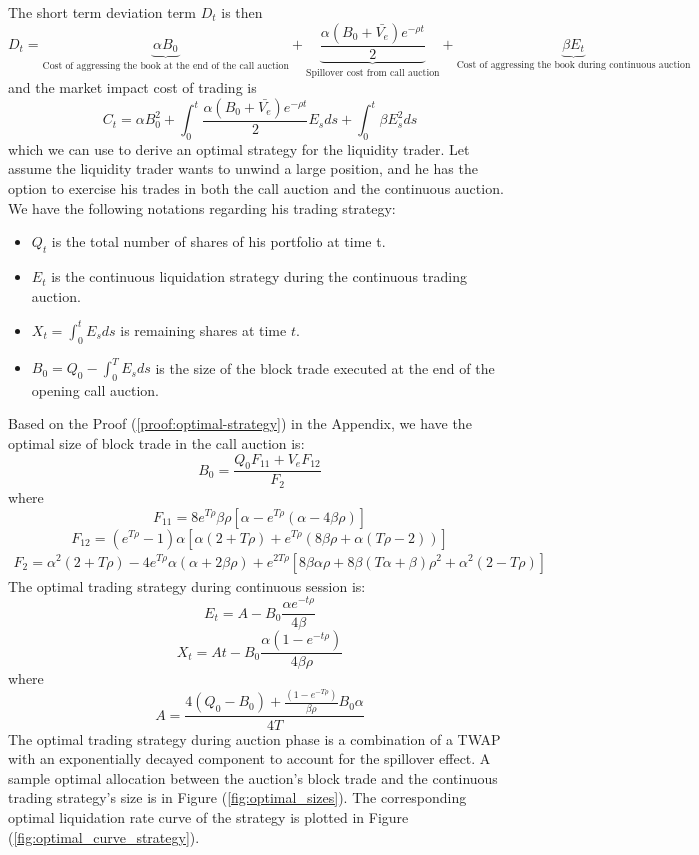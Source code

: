 \documentclass{article}
\begin{document}
The short term deviation term $D_t$ is then
\[
  D_t = \underbrace{\alpha B_0 }_\text{Cost of aggressing the book at the end of the call auction} +
  \underbrace{\frac{\alpha (B_0 + \bar{V_e}) e^{-\rho t}}{2}}_\text{Spillover cost from call auction} +  \underbrace{\beta E_t}_\text{Cost of aggressing the book during continuous auction}
\]
and the market impact cost of trading is
\begin{equation}\label{eqn:cost_equation_all}
  C_t = \alpha B_0^2 + \int_0^t \frac{\alpha (B_0 + \bar{V_e}) e^{-\rho t}}{2} E_s ds + \int_0^t \beta E_s^2 ds
\end{equation}
which we can use to derive an optimal strategy for the liquidity trader. Let assume the liquidity trader wants to unwind a large position, and he has the option to exercise his trades in both the call auction and the continuous auction. We have the following notations regarding his trading strategy:

\begin{itemize}
  \item $Q_t$ is the total number of shares of his portfolio at time t.
  \item $E_t$ is the continuous liquidation strategy during the continuous trading auction.
  \item $X_t=\int_0^t E_s ds$ is remaining shares at time $t$.
  \item $B_0=Q_0 - \int_0^T E_s ds$ is the size of the block trade executed at the end of the opening call auction.
\end{itemize}

Based on the Proof (\ref{proof:optimal-strategy}) in the Appendix, we have the optimal size of block trade in the call auction is:
\[
  B_0 = \frac{Q_0 F_{11} + V_e F_{12}}{F_2}
\]
where
\[
  F_{11} = 8 e^{T \rho} \beta \rho [\alpha - e^{T \rho} (\alpha - 4 \beta \rho)]
\]
\[
  F_{12} = (e^{T \rho}-1) \alpha [\alpha (2+T \rho) + e^{T \rho} (8 \beta \rho + \alpha (T \rho - 2 ))]
\]
\[
  \begin{split}
    F_2 = \alpha^2 (2 + T \rho) - 4 e^{T \rho} \alpha (\alpha + 2 \beta \rho)
    + e^{2 T \rho} [8 \beta \alpha \rho + 8 \beta (T \alpha + \beta) \rho^2 + \alpha^2 (2 - T \rho)]
  \end{split}
\]
The optimal trading strategy during continuous session is:
\[
  E_t = A - B_0 \frac{\alpha e^{-t \rho}}{4 \beta}
\]
\[
  X_t = A t - B_0 \frac{\alpha (1- e^{-t \rho})}{4 \beta \rho}
\]
where
\[
  A =   \frac{4 (Q_0 - B_0) + \frac{(1 - e^{-T \rho})}{\beta \rho} B_0 \alpha} {4 T}
\]
The optimal trading strategy during auction phase is a combination of a TWAP with an exponentially decayed component to account for the spillover effect. A sample optimal allocation between the auction's block trade and the continuous trading strategy's size is in Figure (\ref{fig:optimal_sizes}). The corresponding optimal liquidation rate curve of the strategy is plotted in Figure (\ref{fig:optimal_curve_strategy}).
\end{document}
